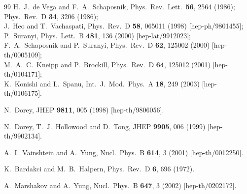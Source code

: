 \begin{thebibliography} {99}
H.~J.~de Vega and F.~A.~Schaposnik,
Phys.\ Rev.\ Lett.\  {\bf 56}, 2564 (1986);
Phys.\ Rev.\ D {\bf 34}, 3206 (1986);\\
J.~Heo and T.~Vachaspati,
Phys.\ Rev.\ D {\bf 58}, 065011 (1998)
[hep-ph/9801455];\\
P.~Suranyi,
Phys.\ Lett.\ B {\bf 481}, 136 (2000)
[hep-lat/9912023];\\
F.~A.~Schaposnik and P.~Suranyi,
Phys.\ Rev.\ D {\bf 62}, 125002 (2000)
[hep-th/0005109];\\
M.~A.~C.~Kneipp and P.~Brockill,
Phys.\ Rev.\ D {\bf 64}, 125012 (2001)
[hep-th/0104171];\\
K.~Konishi and L.~Spanu,
Int.\ J.\ Mod.\ Phys.\ A {\bf 18}, 249 (2003)
[hep-th/0106175].

N.~Dorey,
JHEP {\bf 9811}, 005 (1998)
[hep-th/9806056].

N.~Dorey, T.~J.~Hollowood and D.~Tong,
JHEP {\bf 9905}, 006 (1999)
[hep-th/9902134].

A.~I.~Vainshtein and A.~Yung,
Nucl.\ Phys.\ B {\bf 614}, 3 (2001)
[hep-th/0012250].

K.~Bardakci and M.~B.~Halpern,
Phys.\ Rev.\ D {\bf 6}, 696 (1972).

A.~Marshakov and A.~Yung,
Nucl.\ Phys.\ B {\bf 647}, 3 (2002)
[hep-th/0202172].


\end{thebibliography}
